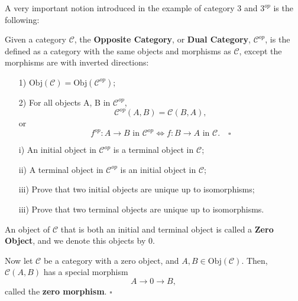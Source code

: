 \documentclass[../category_theory.tex]{subfiles}
\begin{document}
A very important notion introduced in the example of category 3 and \(3^{op}\) is the following:
\begin{def*}
	Given a category \(\mathcal{C}\), the \textbf{Opposite Category}, or \textbf{Dual Category}, \(\mathcal{C}^{op}\), is the defined as a category with the same objects and morphisms as \(\mathcal{C}\), except the morphisms are with inverted directions:
	\begin{itemize}
		\item[1)] \(\mathrm{Obj}(\mathcal{C})=\mathrm{Obj}(\mathcal{C}^{op})\);
		\item[2)] For all objects A, B in \(\mathcal{C}^{op}\),
		      \[
			      \mathcal{C}^{op}(A, B)=\mathcal{C}(B, A),
		      \]
		      or
		      \[
			      f^{op}:A\rightarrow B \text{ in }\mathcal{C}^{op} \Longleftrightarrow f:B\rightarrow A \text{ in }\mathcal{C}.\quad \square
		      \]
	\end{itemize}
\end{def*}
\begin{exr}
	\begin{itemize}
		\item[i)] An initial object in \(\mathcal{C}^{op}\) is a terminal object in \(\mathcal{C}\);
		\item[ii)] A terminal object in \(\mathcal{C}^{op}\) is an initial object in \(\mathcal{C}\);
		\item[iii)] Prove that two initial objects are unique up to isomorphisms;
		\item[iii)] Prove that two terminal objects are unique up to isomorphisms.
	\end{itemize}
\end{exr}
\begin{def*}
	An object of \(\mathcal{C}\) that is both an initial and terminal object is called a \textbf{Zero Object}, and we denote this objects by 0.

	Now let \(\mathcal{C}\) be a category with a zero object, and \(A, B\in \mathrm{Obj}(\mathcal{C})\). Then, \(\mathcal{C}(A, B)\) has a special morphism
	\[
		A\rightarrow 0 \rightarrow B,
	\]
	called the \textbf{zero morphism}. \(\square\)
\end{def*}
\end{document}

